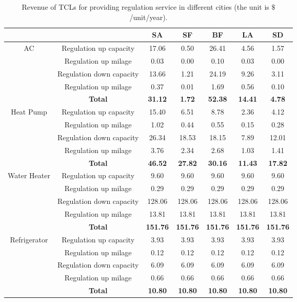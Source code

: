 \documentclass[onecolumn,journal]{IEEEtran}
\begin{document}
\begin{table}[tb]
\caption{Revenue of \acp{TCL} for providing regulation service in different cities (the unit is $\$$/unit/year). }
\label{tab:revenue}
\vspace{6pt}
\centering
{\scriptsize
\begin{tabular}{c c|| c| c | c | c | c}
 & & SA & SF & BF & LA & SD \\
 \hline \hline
\multirow{3}{*}{AC} & Regulation up capacity & 17.06   & 0.50  & 26.41  & 4.56 & 1.57 \\
 & Regulation up milage  &  0.03  & 0.00  & 0.10  & 0.03  &  0.00 \\
 & Regulation down capacity  & 13.66   & 1.21 & 24.19 & 9.26 & 3.11 \\
 &  Regulation up milage & 0.37 & 0.01 & 1.69 & 0.56 & 0.10 \\
 &  \textbf{Total} & \textbf{31.12}  & \textbf{1.72} & \textbf{52.38} & \textbf{14.41} & \textbf{4.78}  \\
\hline
\multirow{3}{*}{Heat Pump} & Regulation up capacity & 15.40  & 6.51 & 8.78 & 2.36 &  4.12\\
 & Regulation up milage  & 1.02 &  0.44 &  0.55 &  0.15 & 0.28  \\
 & Regulation down capacity  &  26.34 & 18.53 & 18.15  & 7.89 & 12.01 \\
 &  Regulation up milage & 3.76 & 2.34 & 2.68 & 1.03 & 1.41 \\
 &   \textbf{Total} & \textbf{46.52} & \textbf{27.82} & \textbf{30.16} & \textbf{11.43} & \textbf{17.82}   \\
\hline
\multirow{3}{*}{Water Heater} & Regulation up capacity & 9.60  & 9.60  &9.60  &9.60  &9.60    \\
 & Regulation up milage  &0.29 & 0.29 & 0.29 & 0.29 & 0.29  \\
 & Regulation down capacity  & 128.06  & 128.06  & 128.06 & 128.06  & 128.06    \\
 & Regulation up milage & 13.81 & 13.81 & 13.81 & 13.81 & 13.81   \\
 &  \textbf{Total} & \textbf{151.76}  & \textbf{151.76} & \textbf{151.76} & \textbf{151.76} & \textbf{151.76 }   \\
\hline
\multirow{3}{*}{Refrigerator} & Regulation up capacity & 3.93  & 3.93  & 3.93  & 3.93  & 3.93    \\
 & Regulation up milage  &  0.12  &  0.12  &  0.12  &  0.12  &  0.12  \\
 & Regulation down capacity  & 6.09  & 6.09  & 6.09  & 6.09  & 6.09   \\
 & Regulation up milage & 0.66 & 0.66 & 0.66 & 0.66 & 0.66   \\
 & \textbf{Total} & \textbf{10.80}  & \textbf{10.80}  & \textbf{10.80}  & \textbf{10.80}  & \textbf{10.80}    \\
\hline
\end{tabular}}
\end{table}
\end{document}
